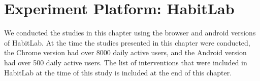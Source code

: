 \section{Experiment Platform: HabitLab}

We conducted the studies in this chapter using the browser and android versions of HabitLab. At the time the studies presented in this chapter were conducted, the Chrome version had over 8000 daily active users, and the Android version had over 500 daily active users. The list of interventions that were included in HabitLab at the time of this study is included at the end of this chapter.
